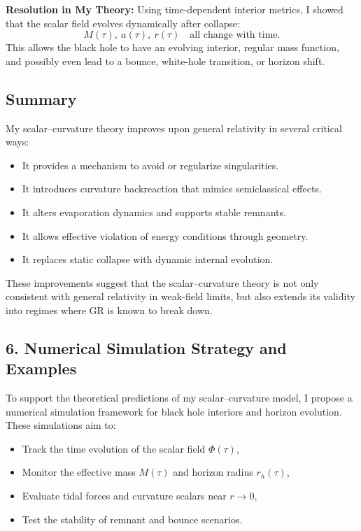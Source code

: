 \documentclass[12pt]{article}
\begin{document}
\textbf{Resolution in My Theory:}  
Using time-dependent interior metrics, I showed that the scalar field evolves dynamically after collapse:
\[
M(\tau),\ a(\tau),\ r(\tau) \quad \text{all change with time.}
\]
This allows the black hole to have an evolving interior, regular mass function, and possibly even lead to a bounce, white-hole transition, or horizon shift.

\subsection{Summary}

My scalar--curvature theory improves upon general relativity in several critical ways:
\begin{itemize}
    \item It provides a mechanism to avoid or regularize singularities.
    \item It introduces curvature backreaction that mimics semiclassical effects.
    \item It alters evaporation dynamics and supports stable remnants.
    \item It allows effective violation of energy conditions through geometry.
    \item It replaces static collapse with dynamic internal evolution.
\end{itemize}

These improvements suggest that the scalar–curvature theory is not only consistent with general relativity in weak-field limits, but also extends its validity into regimes where GR is known to break down.

\subsection{6. Numerical Simulation Strategy and Examples}

To support the theoretical predictions of my scalar--curvature model, I propose a numerical simulation framework for black hole interiors and horizon evolution. These simulations aim to:

\begin{itemize}
    \item Track the time evolution of the scalar field \( \Phi(\tau) \),
    \item Monitor the effective mass \( M(\tau) \) and horizon radius \( r_h(\tau) \),
    \item Evaluate tidal forces and curvature scalars near \( r \to 0 \),
    \item Test the stability of remnant and bounce scenarios.
\end{itemize}
\end{document}
